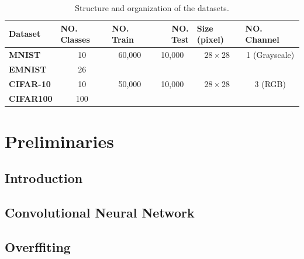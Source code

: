 \begin{table}[]
  \label{dataset_table}
  \begin{tabular}{
      l |
      c
      c
      c
      c
      c}
    \hline
    {\textbf{Dataset}}  & \multicolumn{1}{l}{{\textbf{NO. Classes}}} & \multicolumn{1}{l}{{\textbf{NO. Train}}} & \multicolumn{1}{r}{{\textbf{NO. Test}}} & \multicolumn{1}{l}{{\textbf{Size (pixel)}}} & \multicolumn{1}{l}{{\textbf{NO. Channel}}} \\ \hline
    {\textbf{MNIST}}    & 10                                         & 60,000                                   & 10,000                                  & $28\times28$                                & 1 (Grayscale)                              \\
    {\textbf{EMNIST}}   & 26                                         &                                          &                                         &                                             &                                            \\
    {\textbf{CIFAR-10}} & 10                                         & 50,000                                   & 10,000                                  & $28\times28$                                & 3 (RGB)                                    \\
    {\textbf{CIFAR100}} & 100                                        &                                          &                                         &                                             &                                            \\ \hline
  \end{tabular}
  \caption{Structure and organization of the datasets.}
\end{table}


\chapter{Preliminaries}
\section{Introduction}
\section{Convolutional Neural Network}
\section{Overffiting}



